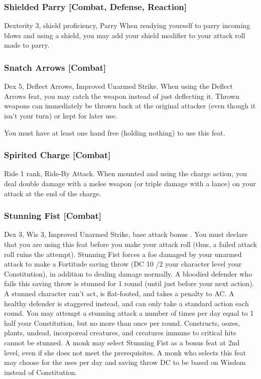 \subsubsection{Shielded Parry [Combat, Defense, Reaction]}
\featpres Dexterity 3, shield proficiency, Parry
\featben When readying yourself to parry incoming blows and using a shield, you may add your shield modifier to your attack roll made to parry.
\subsubsection{Snatch Arrows [Combat]}
 Dex 5, Deflect Arrows, Improved Unarmed Strike.
 When using the Deflect Arrows feat, you may catch the weapon instead of just deflecting it. Thrown weapons can immediately be thrown back at the original attacker (even though it isn't your turn) or kept for later use.
\par You must have at least one hand free (holding nothing) to use this feat.%

\subsubsection{Spirited Charge [Combat]}
 Ride 1 rank, Ride-By Attack.
 When mounted and using the charge action, you deal double damage with a melee weapon (or triple damage with a lance) on your attack at the end of the charge.%

\subsubsection{Stunning Fist [Combat]}
 Dex 3, Wis 3, Improved Unarmed Strike, base attack bonus .
 You must declare that you are using this feat before you make your attack roll (thus, a failed attack roll ruins the attempt). Stunning Fist forces a foe damaged by your unarmed attack to make a Fortitude saving throw (DC 10 /2 your character level \add your Constitution), in addition to dealing damage normally. A bloodied defender who fails this saving throw is stunned for 1 round (until just before your next action). A stunned character can't act, is flat-footed, and takes a  penalty to AC. A healthy defender is staggered instead, and can only take a standard action each round. You may attempt a stunning attack a number of times per day equal to 1 \add half your Constitution, but no more than once per round. Constructs, oozes, plants, undead, incorporeal creatures, and creatures immune to critical hits cannot be stunned.
 A monk may select Stunning Fist as a bonus feat at 2nd level, even if she does not meet the prerequisites. A monk who selects this feat may choose for the uses per day and saving throw DC to be based on Wisdom instead of Constitution.

